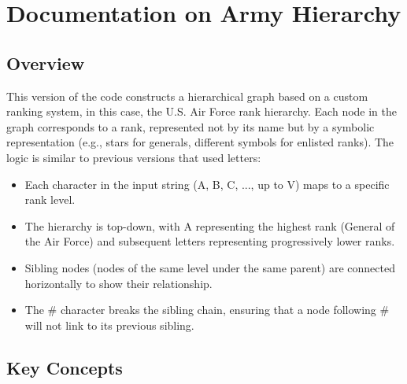 \section{Documentation on Army Hierarchy}

\subsection{Overview}

This version of the code constructs a hierarchical graph based on a custom ranking system, in this case, the U.S. Air Force rank hierarchy. Each node in the graph corresponds to a rank, represented not by its name but by a symbolic representation (e.g., stars for generals, different symbols for enlisted ranks).
The logic is similar to previous versions that used letters:

\begin{itemize}
\item     Each character in the input string (A, B, C, ..., up to V) maps to a specific rank level.
    
\item     The hierarchy is top-down, with A representing the highest rank (General of the Air Force) and subsequent letters representing progressively lower ranks.
    
\item     Sibling nodes (nodes of the same level under the same parent) are connected horizontally to show their relationship.
    
\item    The \# character breaks the sibling chain, ensuring that a node following \# will not link to its previous sibling.
\end{itemize}

\subsection{Key Concepts}

